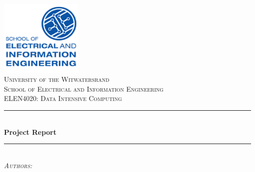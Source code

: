 \documentclass[10pt,twocolumn]{witseiepaper}
\begin{document}
	
	\begin{titlepage}
		
		\newcommand{\HRule}{\rule{\linewidth}{0.3mm}} %
		
		\center %
		
		\includegraphics[width=0.3\textwidth]{EIE.png}\\[1cm] %
		
		\textsc{\LARGE University of the Witwatersrand } \\[0.1cm] %
		\textsc{\LARGE School of Electrical and Information Engineering }\\[1cm] %
		\textsc{\Large ELEN4020: Data Intensive Computing}\\[1.5cm] %
		
		
		\HRule \\[0.4cm]
		{ \huge \bfseries Project Report} \\[0.4cm] %
		\HRule \\[1.5cm]
		
		\textsc{\Large 	\emph{Authors:} } \\[0.1cm]	 
		

\end{titlepage}
\end{document}
